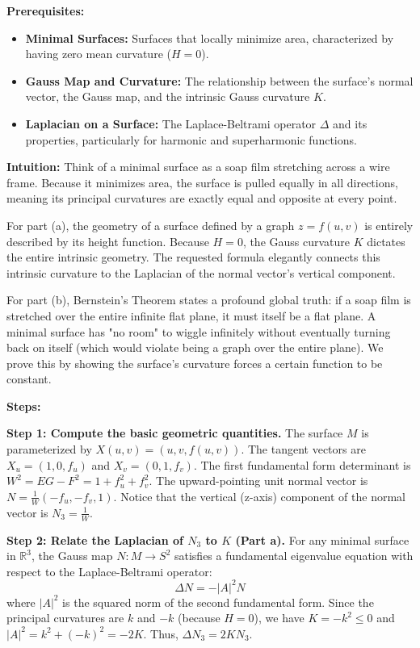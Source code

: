\begin{solution}
\textbf{Prerequisites:} 
\begin{itemize}
    \item \textbf{Minimal Surfaces:} Surfaces that locally minimize area, characterized by having zero mean curvature ($H = 0$).
    \item \textbf{Gauss Map and Curvature:} The relationship between the surface's normal vector, the Gauss map, and the intrinsic Gauss curvature $K$.
    \item \textbf{Laplacian on a Surface:} The Laplace-Beltrami operator $\Delta$ and its properties, particularly for harmonic and superharmonic functions.
\end{itemize}

\textbf{Intuition:} 
Think of a minimal surface as a soap film stretching across a wire frame. Because it minimizes area, the surface is pulled equally in all directions, meaning its principal curvatures are exactly equal and opposite at every point. 

For part (a), the geometry of a surface defined by a graph $z = f(u,v)$ is entirely described by its height function. Because $H=0$, the Gauss curvature $K$ dictates the entire intrinsic geometry. The requested formula elegantly connects this intrinsic curvature to the Laplacian of the normal vector's vertical component.

For part (b), Bernstein's Theorem states a profound global truth: if a soap film is stretched over the entire infinite flat plane, it must itself be a flat plane. A minimal surface has "no room" to wiggle infinitely without eventually turning back on itself (which would violate being a graph over the entire plane). We prove this by showing the surface's curvature forces a certain function to be constant.

\textbf{Steps:}

\textbf{Step 1: Compute the basic geometric quantities.}
The surface $M$ is parameterized by $X(u, v) = (u, v, f(u, v))$.
The tangent vectors are $X_u = (1, 0, f_u)$ and $X_v = (0, 1, f_v)$.
The first fundamental form determinant is $W^2 = EG - F^2 = 1 + f_u^2 + f_v^2$.
The upward-pointing unit normal vector is $N = \frac{1}{W} (-f_u, -f_v, 1)$.
Notice that the vertical (z-axis) component of the normal vector is $N_3 = \frac{1}{W}$.

\textbf{Step 2: Relate the Laplacian of $N_3$ to $K$ (Part a).}
For any minimal surface in $\mathbb{R}^3$, the Gauss map $N: M \to S^2$ satisfies a fundamental eigenvalue equation with respect to the Laplace-Beltrami operator:
\[ \Delta N = -|A|^2 N \]
where $|A|^2$ is the squared norm of the second fundamental form. 
Since the principal curvatures are $k$ and $-k$ (because $H=0$), we have $K = -k^2 \le 0$ and $|A|^2 = k^2 + (-k)^2 = -2K$.
Thus, $\Delta N_3 = 2K N_3$.


\end{solution}
